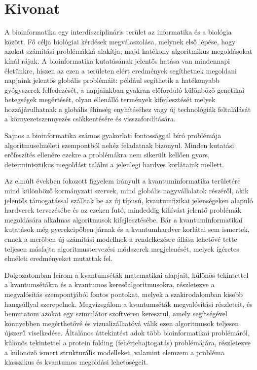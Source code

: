 \setcounter{page}{1}

\selecthungarian

\chapter*{Kivonat}

A bioinformatika egy interdiszciplináris terület az informatika és a biológia között. Fő célja biológiai kérdések megválaszolása, melynek első lépése, hogy azokat számítási problémákká alakítja, majd hatékony algoritmikus megoldásokat kínál rájuk. A bioinformatika kutatásának jelentős hatása van mindennapi életünkre, hiszen az ezen a területen elért eredmények segíthetnek megoldani napjaink jelentős globális problémáit: például segíthetik a hatékonyabb gyógyszerek felfedezését, a napjainkban gyakran előforduló különböző genetikai betegségek megértését, olyan ellenálló termények kifejlesztését melyek hozzájárulhatnak a globális éhínség enyhítéséhez vagy új technológiák feltalálását a környezetszennyezés csökkentésére és visszafordítására.

Sajnos a bioinformatika számos gyakorlati fontossággal bíró problémája algoritmuselméleti szempontból nehéz feladatnak bizonyul. Minden kutatási erőfeszítés ellenére ezekre a problémákra nem sikerült kellően gyors, determinisztikus megoldást találni a jelenlegi hardves korlátaink mellett.

Az elmúlt években fokozott figyelem irányult a kvantuminformatika területére mind különböző kormányzati szervek, mind globális nagyvállalatok részéről, akik jelentős támogatással szálltak be az új típusú, kvantumfizikai jelenségeken alapuló hardverek tervezésébe és az ezeken futó, mindeddig kihívást jelentő problémák megoldására alkalmas algoritmusok kifejlesztésébe. Bár a kvantuminformatikai kutatások még gyerekcipőben járnak és a kvantumhardver korlátai sem ismertek, ennek a merőben új számítási modellnek a rendelkezésre állása lehetővé tette teljesen másfajta algoritmustervezési módszerek megjelenését, melyek ígéretes elméleti eredményeket mutattak fel.

Dolgozatomban leírom a kvantumséták matematikai alapjait, különös tekintettel a kvantumsétákra és a kvantumos keresőalgoritmusokra, részletezve a megvalósítás szempontjából fontos pontokat, melyek a szakirodalomban kisebb hangsúllyal szerepelnek. Megvizsgálom a kvantumséták megvalósítási részleteit, és bemutatom azokat egy szimulátor szoftveren keresztül, amely segítségével könnyebben megérthetővé és vizualizálhatóvá válik ezen algoritmusok teljesen újszerű viselkedése. Általános áttekintést adok több bioinformatikai problémáról, különös tekintettel a protein folding (fehérjehajtogatás) problémájára, részletezve a különöző ismert strukturális modelleket, valamint elemzem a probléma klasszikus és kvantumos megoldási lehetőségeit.

